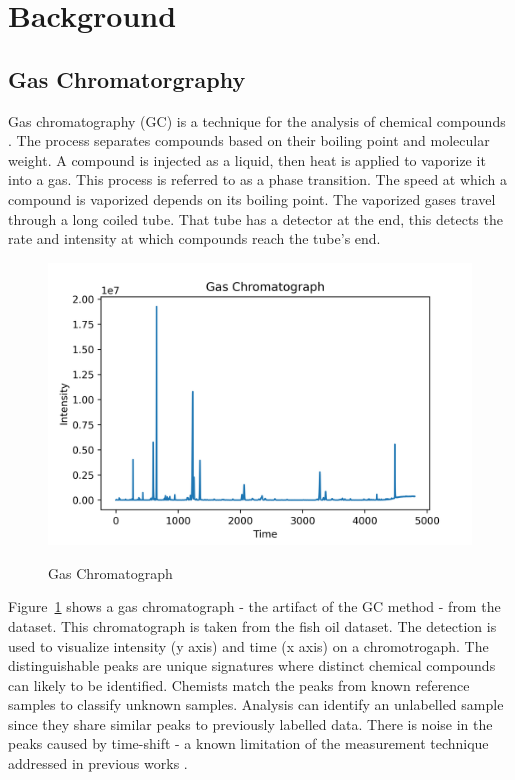 \documentclass[runningheads]{llncs}
\begin{document}
\section{Background}
\label{background}

\subsection{Gas Chromatorgraphy}

Gas chromatography (GC) is a technique for the analysis of chemical compounds \cite{eder1995gas,restek2018high}.
The process separates compounds based on their boiling point and molecular weight.
A compound is injected as a liquid, then heat is applied to vaporize it into a gas. 
This process is referred to as a phase transition. 
The speed at which a compound is vaporized depends on its boiling point. 
The vaporized gases travel through a long coiled tube.
That tube has a detector at the end, this detects the rate and intensity at which compounds reach the tube's end. 


\begin{figure}[htb]
  \centering
  \caption{Gas Chromatograph}
  \includegraphics[width=12.5cm]{chromatograph.png}
  \label{fig:gas-chromatography} 
  \captionsetup[figure]{font=small,labelfont=small}
\end{figure}

Figure~\ref{fig:gas-chromatography} shows a gas chromatograph - the artifact of the GC method - from the dataset. 
This chromatograph is taken from the fish oil dataset.
The detection is used to visualize intensity (y axis) and time (x axis) on a chromotrogaph. 
The distinguishable peaks are unique signatures where distinct chemical compounds can likely to be identified.
Chemists match the peaks from known reference samples to classify unknown samples. 
Analysis can identify an unlabelled sample since they share similar peaks to previously labelled data.
There is noise in the peaks caused by time-shift - a known limitation of the measurement technique addressed in previous works \cite{tomasi2004correlation,zhang2008two}.
\end{document}
